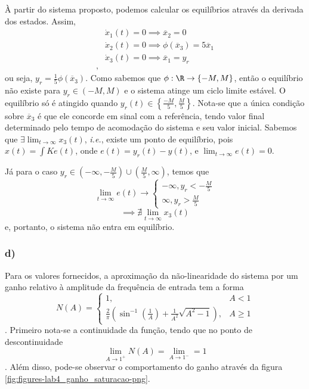 \documentclass[a4paper]{report}
\begin{document}
À partir do sistema proposto, podemos calcular os equilíbrios através da derivada dos estados. Assim,
\begin{align*}
    &\dot{x}_1(t) = 0 \implies \overline{x}_2 = 0 \\
    &\dot{x}_2(t) = 0 \implies \phi \left( \overline{x}_3 \right) = 5\overline{x}_1 \\
    &\dot{x}_3(t) = 0 \implies \overline{x}_1 = y_r \\
,\end{align*}
ou seja, $y_r = \frac{1}{5}\phi \left( \overline{x}_3 \right) $. Como sabemos que $\phi:\R\to \left\{ -M, M \right\} $, então o equilíbrio não existe para $y_r \in (-M,M)$ e o sistema atinge um ciclo limite estável. O equilíbrio só é atingido quando $y_r(t) \in \left\{  \frac{-M}{5}, \frac{M}{5} \right\}$. Nota-se que a única condição sobre $\overline{x}_3$ é que ele concorde em sinal com a referência, tendo valor final determinado pelo tempo de acomodação do sistema e seu valor inicial. Sabemos que $\exists \lim_{t \to \infty} x_3(t)$, \emph{i.e.}, existe um ponto de equilíbrio, pois $x(t) = \int Ke(t)$, onde $e(t) = y_r(t) - y(t)$, e $\lim_{t \to \infty} e(t) = 0$.

Já para o caso $y_r \in (-\infty,-\frac{M}{5}) \cup (\frac{M}{5},\infty)$, temos que \[
\lim_{t \to \infty} e(t) \to \begin{cases}
    -\infty, y_r < -\frac{M}{5} \\
    \infty, y_r > \frac{M}{5}
\end{cases}
\] \[
\implies \nexists \lim_{t \to \infty} x_3(t)
\] e, portanto, o sistema não entra em equilíbrio.

\subsubsection*{d)}

Para os valores fornecidos, a aproximação da não-linearidade do sistema por um ganho relativo à amplitude da frequência de entrada tem a forma \[
    N(A) = \begin{cases}
	1,& A<1 \\
	\frac{2}{\pi}\left( \sin^{-1}\left( \frac{1}{A} \right) + \frac{1}{A^2}\sqrt{A^2 - 1}  \right),& A\ge 1
    \end{cases}
\]. Primeiro nota-se a continuidade da função, tendo que no ponto de descontinuidade \[
\lim_{A \to 1^{+}} N(A) = \lim_{A \to 1^{-}} = 1
\]. Além disso, pode-se observar o comportamento do ganho através da figura \ref{fig:figures-lab4_ganho_saturacao-png}.
\end{document}

